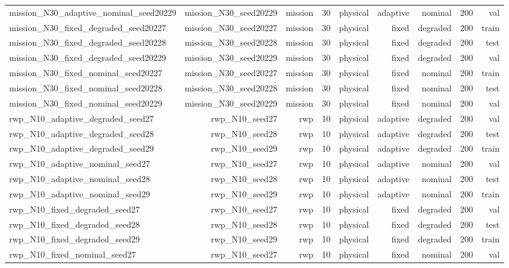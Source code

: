 \begin{tabular}{lrrrrrrrr}
mission\_N30\_adaptive\_nominal\_seed20229 & mission\_N30\_seed20229 & mission & 30 & physical & adaptive & nominal & 200 & val \\
mission\_N30\_fixed\_degraded\_seed20227 & mission\_N30\_seed20227 & mission & 30 & physical & fixed & degraded & 200 & train \\
mission\_N30\_fixed\_degraded\_seed20228 & mission\_N30\_seed20228 & mission & 30 & physical & fixed & degraded & 200 & test \\
mission\_N30\_fixed\_degraded\_seed20229 & mission\_N30\_seed20229 & mission & 30 & physical & fixed & degraded & 200 & val \\
mission\_N30\_fixed\_nominal\_seed20227 & mission\_N30\_seed20227 & mission & 30 & physical & fixed & nominal & 200 & train \\
mission\_N30\_fixed\_nominal\_seed20228 & mission\_N30\_seed20228 & mission & 30 & physical & fixed & nominal & 200 & test \\
mission\_N30\_fixed\_nominal\_seed20229 & mission\_N30\_seed20229 & mission & 30 & physical & fixed & nominal & 200 & val \\
rwp\_N10\_adaptive\_degraded\_seed27 & rwp\_N10\_seed27 & rwp & 10 & physical & adaptive & degraded & 200 & val \\
rwp\_N10\_adaptive\_degraded\_seed28 & rwp\_N10\_seed28 & rwp & 10 & physical & adaptive & degraded & 200 & test \\
rwp\_N10\_adaptive\_degraded\_seed29 & rwp\_N10\_seed29 & rwp & 10 & physical & adaptive & degraded & 200 & train \\
rwp\_N10\_adaptive\_nominal\_seed27 & rwp\_N10\_seed27 & rwp & 10 & physical & adaptive & nominal & 200 & val \\
rwp\_N10\_adaptive\_nominal\_seed28 & rwp\_N10\_seed28 & rwp & 10 & physical & adaptive & nominal & 200 & test \\
rwp\_N10\_adaptive\_nominal\_seed29 & rwp\_N10\_seed29 & rwp & 10 & physical & adaptive & nominal & 200 & train \\
rwp\_N10\_fixed\_degraded\_seed27 & rwp\_N10\_seed27 & rwp & 10 & physical & fixed & degraded & 200 & val \\
rwp\_N10\_fixed\_degraded\_seed28 & rwp\_N10\_seed28 & rwp & 10 & physical & fixed & degraded & 200 & test \\
rwp\_N10\_fixed\_degraded\_seed29 & rwp\_N10\_seed29 & rwp & 10 & physical & fixed & degraded & 200 & train \\
rwp\_N10\_fixed\_nominal\_seed27 & rwp\_N10\_seed27 & rwp & 10 & physical & fixed & nominal & 200 & val \\

\end{tabular}
